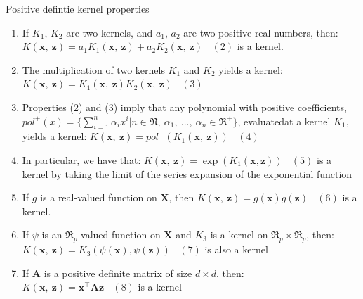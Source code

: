 \documentclass[
  ignorenonframetext,
]{beamer}
\begin{document}
\begin{frame}{Positive defintie kernel properties}
\protect\hypertarget{positive-defintie-kernel-properties}{}
\begin{enumerate}
\item
  If \(K_1\), \(K_2\) are two kernels, and \(a_1\), \(a_2\) are two
  positive real numbers, then:
  \(K(\pmb x,\ \pmb z) = a_1K_1(\pmb x,\ \pmb z) + a_2K_2(\pmb x,\ \pmb z)\ \ \ \ (2)\)
  is a kernel.
\item
  The multiplication of two kernels \(K_1\) and \(K_2\) yields a kernel:
  \(K(\pmb x,\ \pmb z) = K_1(\pmb x,\ \pmb z)K_2(\pmb x,\ \pmb z)\ \ \ \  (3)\)
\item
  Properties (2) and (3) imply that any polynomial with positive
  coefficients,
  \(pol^+(x) = \{ \sum^n_{i=1} \alpha_i x^i|n \in \mathfrak N,\ \alpha_1,\ ... ,\ \alpha_n \in \mathfrak R^+ \}\),
  evaluatedat a kernel \(K_1\), yields a kernel:
  \(K(\pmb x,\ \pmb z) = pol^+(K_1(\pmb x,\ \pmb z)) \ \ \ \ (4)\)
\end{enumerate}
\end{frame}

\begin{frame}{}
\protect\hypertarget{section}{}
\begin{enumerate}
\setcounter{enumi}{3}
\item
  In particular, we have that:
  \(K(\pmb x,\ \pmb z) = \exp(K_1(\pmb x, \pmb z)) \ \ \ \ (5)\) is a
  kernel by taking the limit of the series expansion of the exponential
  function
\item
  If \(g\) is a real-valued function on \(\pmb X\), then
  \(K(\pmb x,\ \pmb z) = g(\pmb x)g(\pmb z) \ \ \ \ (6)\) is a kernel.
\item
  If \(\psi\) is an \(\mathfrak R_p\)-valued function on \(\pmb X\) and
  \(K_3\) is a kernel on \(\mathfrak R_p \times \mathfrak R_p\), then:
  \(K(\pmb x,\ \pmb z) = K_3(\psi(\pmb x), \psi(\pmb z))\ \ \ \ (7)\) is
  also a kernel
\item
  If \(\pmb A\) is a positive definite matrix of size \(d \times d\),
  then: \(K(\pmb x,\ \pmb z) = \pmb x^{\top} \pmb A \pmb z \ \ \ \ (8)\)
  is a kernel
\end{enumerate}
\end{frame}
\end{document}
